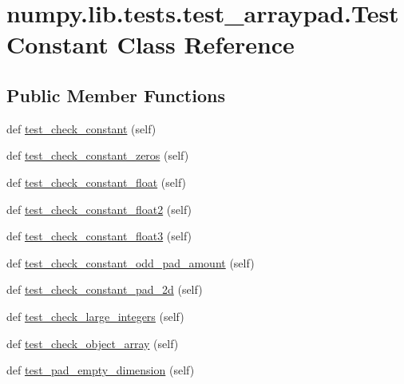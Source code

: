 \hypertarget{classnumpy_1_1lib_1_1tests_1_1test__arraypad_1_1TestConstant}{}\section{numpy.\+lib.\+tests.\+test\+\_\+arraypad.\+Test\+Constant Class Reference}
\label{classnumpy_1_1lib_1_1tests_1_1test__arraypad_1_1TestConstant}
\subsection*{Public Member Functions}
\begin{DoxyCompactItemize}
\item 
def \hyperlink{classnumpy_1_1lib_1_1tests_1_1test__arraypad_1_1TestConstant_abd9bd6115fb45bc04765d7671670ad06}{test\+\_\+check\+\_\+constant} (self)
\item 
def \hyperlink{classnumpy_1_1lib_1_1tests_1_1test__arraypad_1_1TestConstant_a21b74464c2d324dfb4bddc1bc1f8bcfc}{test\+\_\+check\+\_\+constant\+\_\+zeros} (self)
\item 
def \hyperlink{classnumpy_1_1lib_1_1tests_1_1test__arraypad_1_1TestConstant_af4a0db4d3920e8039645f831f5617506}{test\+\_\+check\+\_\+constant\+\_\+float} (self)
\item 
def \hyperlink{classnumpy_1_1lib_1_1tests_1_1test__arraypad_1_1TestConstant_a7239c3feadf71f694366502a707d298d}{test\+\_\+check\+\_\+constant\+\_\+float2} (self)
\item 
def \hyperlink{classnumpy_1_1lib_1_1tests_1_1test__arraypad_1_1TestConstant_abcb96cf5803651bdd4c509ef571ccf98}{test\+\_\+check\+\_\+constant\+\_\+float3} (self)
\item 
def \hyperlink{classnumpy_1_1lib_1_1tests_1_1test__arraypad_1_1TestConstant_afcedf942ef94920f3637449f235a32d2}{test\+\_\+check\+\_\+constant\+\_\+odd\+\_\+pad\+\_\+amount} (self)
\item 
def \hyperlink{classnumpy_1_1lib_1_1tests_1_1test__arraypad_1_1TestConstant_a615efeffbd80156854b445a014432277}{test\+\_\+check\+\_\+constant\+\_\+pad\+\_\+2d} (self)
\item 
def \hyperlink{classnumpy_1_1lib_1_1tests_1_1test__arraypad_1_1TestConstant_a81bc9b56acee79e8344e70258820b18d}{test\+\_\+check\+\_\+large\+\_\+integers} (self)
\item 
def \hyperlink{classnumpy_1_1lib_1_1tests_1_1test__arraypad_1_1TestConstant_a74524702d01db4b0e12a5edeace729f6}{test\+\_\+check\+\_\+object\+\_\+array} (self)
\item 
def \hyperlink{classnumpy_1_1lib_1_1tests_1_1test__arraypad_1_1TestConstant_a31373569d9f74a01c1674dd8555224d8}{test\+\_\+pad\+\_\+empty\+\_\+dimension} (self)
\end{DoxyCompactItemize}


